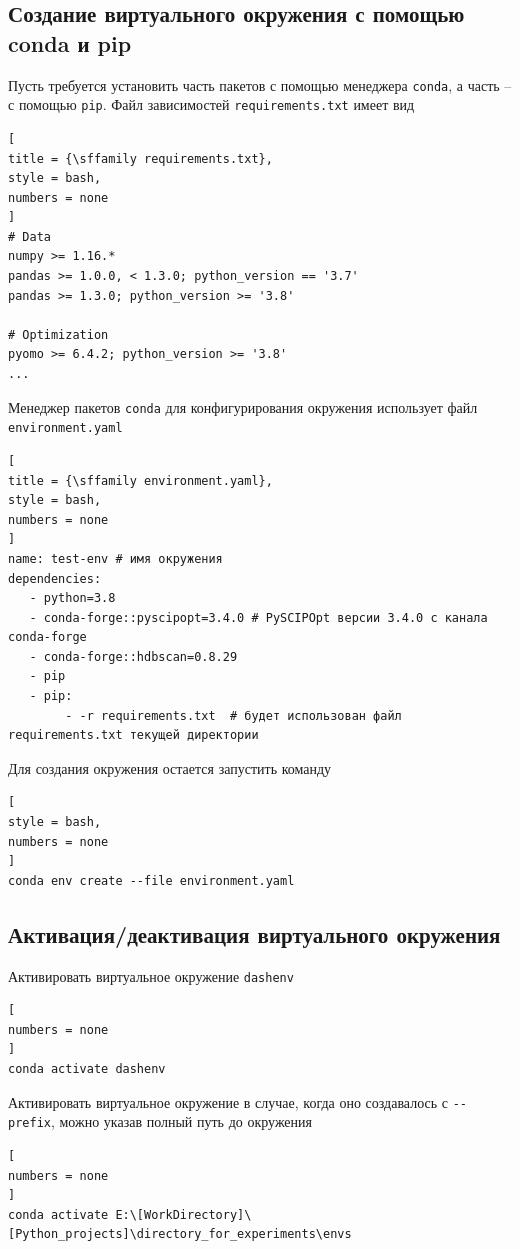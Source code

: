 \documentclass[%
	11pt,
	a4paper,
	utf8,
		]{article}
\begin{document}
\subsection{Создание виртуального окружения с помощью conda и pip}

Пусть требуется установить часть пакетов с помощью менеджера \texttt{conda}, а часть -- с помощью \texttt{pip}. Файл зависимостей \texttt{requirements.txt} имеет вид
\begin{lstlisting}[
title = {\sffamily requirements.txt},
style = bash,
numbers = none
]
# Data
numpy >= 1.16.*
pandas >= 1.0.0, < 1.3.0; python_version == '3.7'
pandas >= 1.3.0; python_version >= '3.8'

# Optimization
pyomo >= 6.4.2; python_version >= '3.8'
...
\end{lstlisting}

Менеджер пакетов \texttt{conda} для конфигурирования окружения использует файл \texttt{environment.yaml}
\begin{lstlisting}[
title = {\sffamily environment.yaml},
style = bash,
numbers = none
]
name: test-env # имя окружения
dependencies:
   - python=3.8
   - conda-forge::pyscipopt=3.4.0 # PySCIPOpt версии 3.4.0 с канала conda-forge
   - conda-forge::hdbscan=0.8.29
   - pip
   - pip:
        - -r requirements.txt  # будет использован файл requirements.txt текущей директории
\end{lstlisting}

Для создания окружения остается запустить команду
\begin{lstlisting}[
style = bash,
numbers = none
]
conda env create --file environment.yaml
\end{lstlisting}


\subsection{Активация/деактивация виртуального окружения}

Активировать виртуальное окружение \texttt{dashenv}

\begin{lstlisting}[
numbers = none
]
conda activate dashenv
\end{lstlisting}

Активировать виртуальное окружение в случае, когда оно создавалось с \lstinline{--prefix}, можно указав полный путь до окружения
\begin{lstlisting}[
numbers = none
]
conda activate E:\[WorkDirectory]\[Python_projects]\directory_for_experiments\envs
\end{lstlisting}
\end{document}
